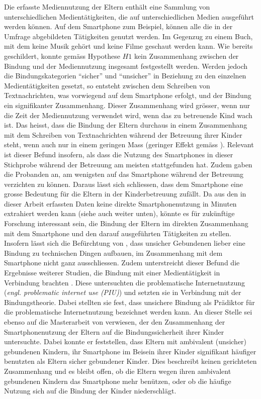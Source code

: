 Die erfasste Mediennutzung der Eltern enthält eine Sammlung von unterschiedlichen Medientätigkeiten, die auf unterschiedlichen Medien ausgeführt werden können. Auf dem Smartphone zum Beispiel, können alle die in der Umfrage abgebildeten Tätigkeiten genutzt werden. Im Gegenzug zu einem Buch, mit dem keine Musik gehört und keine Filme geschaut werden kann. Wie bereits geschildert, konnte gemäss Hypothese $H1$ kein Zusammenhang zwischen der Bindung und der Mediennutzung insgesamt festgestellt werden. Werden jedoch die Bindungskategorien \enquote{sicher} und \enquote{unsicher} in Beziehung zu den einzelnen Medientätigkeiten gesetzt, so entsteht zwischen dem Schreiben von Textnachrichten, was vorwiegend auf dem Smartphone erfolgt, und der Bindung ein signifikanter Zusammenhang. Dieser Zusammenhang wird grösser, wenn nur die Zeit der Mediennutzung verwendet wird, wenn das zu betreuende Kind wach ist. Das heisst, dass die Bindung der Eltern durchaus in einem Zusammenhang mit dem Schreiben von Textnachrichten während der Betreuung ihrer Kinder steht, wenn auch nur in einem geringen Mass (geringer Effekt gemäss ). Relevant ist dieser Befund insofern, als dass die Nutzung des Smartphones in dieser Stichprobe während der Betreuung am meisten stattgefunden hat. Zudem gaben die Probanden an, am wenigsten auf das Smartphone während der Betreuung verzichten zu können. Daraus lässt sich schliessen, dass dem Smartphone eine grosse Bedeutung für die Eltern in der Kinderbetreuung zufällt. Da aus den in dieser Arbeit erfassten Daten keine direkte Smartphonenutzung in Minuten extrahiert werden kann (siehe auch \textit{} weiter unten), könnte es für zukünftige Forschung interessant sein, die Bindung der Eltern im direkten Zusammenhang mit dem Smartphone und den darauf ausgeführten Tätigkeiten zu stellen. Insofern lässt sich die Befürchtung von , dass unsicher Gebundenen lieber eine Bindung zu technischen Dingen aufbauen, im Zusammenhang mit dem Smartphone nicht ganz ausschliessen. Zudem unterstreicht dieser Befund die Ergebnisse weiterer Studien, die Bindung mit  einer Medientätigkeit in Verbindung brachten \cite{Jia2016, Chang2015, Lin2011a}. Diese untersuchten die problematische Internetnutzung (\textit{engl. problematic internet use (PIU)}) und setzten sie in Verbindung mit der Bindungstheorie. Dabei stellten sie fest, dass unsichere Bindung als Prädiktor für die problematische Internetnutzung bezeichnet werden kann. An dieser Stelle sei ebenso auf die Masterarbeit von  verwiesen, der den Zusammenhang der Smartphonenutzung der Eltern auf die Bindungssicherheit ihrer Kinder untersuchte. Dabei konnte er feststellen, dass Eltern mit ambivalent (unsicher) gebundenen Kindern, ihr Smartphone im Beisein ihrer Kinder signifikant häufiger benutzten als Eltern sicher gebundener Kinder. Dies beschreibt keinen gerichteten Zusammenhang und es bleibt offen, ob die Eltern wegen ihren ambivalent gebundenen Kindern das Smartphone mehr benützen, oder ob die häufige Nutzung sich auf die Bindung der Kinder niederschlägt.

